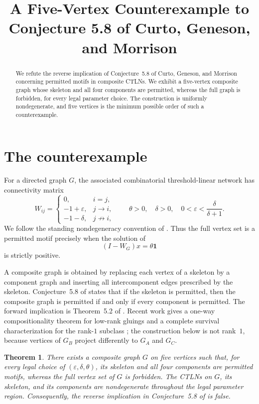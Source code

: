 \documentclass[11pt]{amsart}
\title[A five-vertex counterexample]
{A Five-Vertex Counterexample to Conjecture 5.8 of Curto, Geneson, and Morrison}
\date{}
\newtheorem{theorem}{Theorem}
\newcommand{\one}{\mathbf{1}}
\newcommand{\eps}{\varepsilon}
\begin{document}
\begin{abstract}
We refute the reverse implication of Conjecture~5.8 of Curto,
Geneson, and Morrison concerning permitted motifs in composite CTLNs.
We exhibit a five-vertex composite graph whose skeleton and all four
components are permitted, whereas the full graph is forbidden, for every
legal parameter choice. The construction is uniformly nondegenerate, and
five vertices is the minimum possible order of such a counterexample.
\end{abstract}

\maketitle

\section{The counterexample}

For a directed graph $G$, the associated combinatorial threshold-linear
network has connectivity matrix
\[
W_{ij}=
\begin{cases}
0, & i=j,\\
-1+\eps, & j\to i,\\
-1-\delta, & j\not\to i,
\end{cases}
\qquad
\theta>0,\quad \delta>0,\quad
0<\eps<\frac{\delta}{\delta+1}.
\]
We follow the standing nondegeneracy convention of \cite{CGM}. Thus the
full vertex set is a permitted motif precisely when the solution of
\[
(I-W_G)x=\theta\one
\]
is strictly positive.

A composite graph is obtained by replacing each vertex of a skeleton by
a component graph and inserting all intercomponent edges prescribed by
the skeleton. Conjecture~5.8 of \cite{CGM} states that if the skeleton is
permitted, then the composite graph is permitted if and only if every
component is permitted. The forward implication is Theorem~5.2 of
\cite{CGM}. Recent work gives a one-way compositionality theorem for
low-rank gluings and a complete survival characterization for the
rank-$1$ subclass \cite{LA}; the construction below is not rank~$1$,
because vertices of $G_B$ project differently to $G_A$ and $G_C$.

\begin{theorem}\label{thm:counterexample}
There exists a composite graph $G$ on five vertices such that, for every
legal choice of $(\eps,\delta,\theta)$, its skeleton and all four
components are permitted motifs, whereas the full vertex set of $G$ is
forbidden. The CTLNs on $G$, its skeleton, and its components are
nondegenerate throughout the legal parameter region. Consequently, the
reverse implication in Conjecture~5.8 of \cite{CGM} is false.
\end{theorem}
\end{document}
